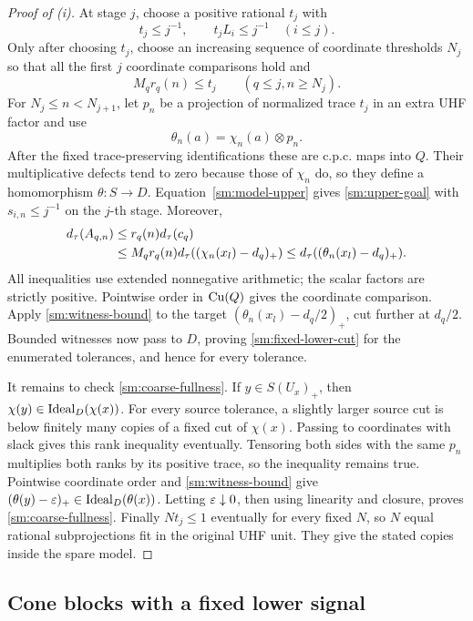 \begin{proof}[Proof of \textup{(i)}]
At stage \(j\), choose a positive rational \(t_j\) with
\[
 t_j\leq j^{-1},
 \qquad t_jL_i\leq j^{-1}\quad(i\leq j).
\]
Only after choosing \(t_j\), choose an increasing sequence
of coordinate thresholds \(N_j\) so that all the first
\(j\) coordinate comparisons hold and
\begin{equation}\label{sm:model-delay}
 M_qr_q(n)\leq t_j
 \qquad(q\leq j, n\geq N_j).
\end{equation}
For \(N_j\leq n<N_{j+1}\), let \(p_n\) be a projection
of normalized trace \(t_j\) in an extra UHF factor and use
\[
 \theta_n(a)=\chi_n(a)\otimes p_n.
\]
After the fixed trace-preserving identifications these are
c.p.c. maps into \(Q\).  Their multiplicative defects tend
to zero because those of \(\chi_n\) do, so they define a
homomorphism \(\theta:S\to D\).
Equation~\eqref{sm:model-upper} gives
\eqref{sm:upper-goal} with \(s_{i,n}\leq j^{-1}\) on the
\(j\)-th stage.  Moreover,
\begin{align}
 d_\tau(A_{q,n})
 &\leq r_q(n)d_\tau(c_q)\notag\\
 &\leq M_qr_q(n)d_\tau((\chi_n(x_l)-d_q)_+)
 \leq d_\tau((\theta_n(x_l)-d_q)_+).
 \label{sm:fraction-lower}
\end{align}
All inequalities use extended nonnegative arithmetic;
the scalar factors are strictly positive.  Pointwise order
in \(\operatorname{Cu}(Q)\) gives the coordinate comparison.  Apply
\eqref{sm:witness-bound} to the target
\((\theta_n(x_l)-d_q/2)_+\), cut further at \(d_q/2\).
Bounded witnesses now pass to \(D\), proving
\eqref{sm:fixed-lower-cut} for the enumerated tolerances,
and hence for every tolerance.

It remains to check \eqref{sm:coarse-fullness}.  If
\(y\in S(U_x)_+\), then
\(\chi(y)\in\operatorname{Ideal}_D(\chi(x))\).  For every source
tolerance, a slightly larger source cut is below finitely
many copies of a fixed cut of \(\chi(x)\).  Passing to
coordinates with slack gives this rank inequality eventually.
Tensoring both sides with the same \(p_n\) multiplies both
ranks by its positive trace, so the inequality remains true.
Pointwise coordinate order and
\eqref{sm:witness-bound} give
\((\theta(y)-\varepsilon)_+\in\operatorname{Ideal}_D(\theta(x))\).
Letting \(\varepsilon\downarrow0\), then using linearity and
closure, proves \eqref{sm:coarse-fullness}.
Finally \(Nt_j\leq1\) eventually for every fixed \(N\),
so \(N\) equal rational subprojections fit in the original
UHF unit.  They give the stated copies inside the spare model.
\end{proof}

\subsection{Cone blocks with a fixed lower signal}

